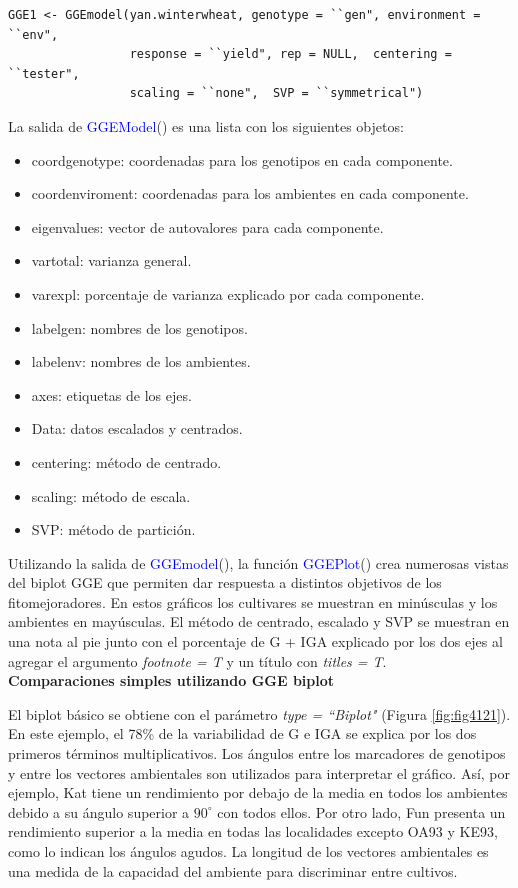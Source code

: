 \begin{tcolorbox}[colframe=aurometalsaurus,colback=backcolour,colbacklower=white,
   				width=1\linewidth,
    			height=0.12\linewidth,
    			boxsep=-3mm]
\begin{lstlisting}
GGE1 <- GGEmodel(yan.winterwheat, genotype = ``gen", environment = ``env", 
                 response = ``yield", rep = NULL,  centering = ``tester",
  				 scaling = ``none",  SVP = ``symmetrical")
\end{lstlisting}
\end{tcolorbox}


La salida de \textcolor{blue}{GGEModel}() es una lista con los siguientes objetos:
\begin{itemize}
\item coordgenotype: coordenadas para los genotipos en cada componente.
\item coordenviroment: coordenadas para los ambientes en cada componente.
\item eigenvalues: vector de autovalores para cada componente.
\item vartotal: varianza general.
\item varexpl: porcentaje de varianza explicado por cada componente.
\item labelgen: nombres de los genotipos.
\item labelenv: nombres de los ambientes.
\item axes: etiquetas de los ejes.
\item Data: datos escalados y centrados.
\item centering: método de centrado.
\item scaling: método de escala.
\item SVP: método de partición. 
\end{itemize}


Utilizando la salida de \textcolor{blue}{GGEmodel}(), la función 
\textcolor{blue}{GGEPlot}() crea numerosas vistas del biplot GGE que permiten dar respuesta a distintos objetivos de los fitomejoradores. En estos gráficos los cultivares se muestran en minúsculas y los ambientes en mayúsculas. El método de centrado, escalado y SVP se muestran en una nota al pie junto con el porcentaje de G + IGA explicado por los dos ejes al agregar el argumento \emph{footnote = T} y un título con \emph{titles = T}. \\

\textbf{Comparaciones simples utilizando GGE biplot}

El biplot básico se obtiene con el parámetro \emph{type = ``Biplot"} (Figura \ref{fig:fig4121}). En este ejemplo, el 78\% de la variabilidad de G e IGA se explica por los dos primeros términos multiplicativos. Los ángulos entre los marcadores de genotipos y entre los vectores ambientales son utilizados para interpretar el gráfico. Así, por ejemplo, Kat tiene un rendimiento por debajo de la media en todos los ambientes debido a su ángulo superior a $90^{\circ}$ con todos ellos. Por otro lado, Fun presenta un rendimiento superior a la media en todas las localidades excepto OA93 y KE93, como lo indican los ángulos agudos. La longitud de los vectores ambientales es una medida de la capacidad del ambiente para discriminar entre cultivos. 


